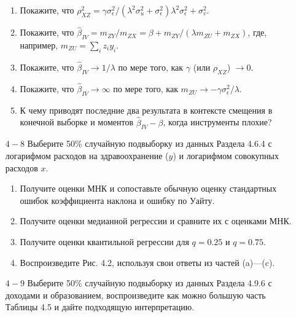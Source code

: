 \begin{small}
\begin{enumerate}
\begin{enumerate}
\item Покажите, что $\rho_{XZ}^2 = \gamma \sigma^2_{\epsilon} /(\lambda^2 \sigma^2_{u} +\sigma^2_{\epsilon})\lambda^2 \sigma^2_{\epsilon} +\sigma^2_{v}$.
\item Покажите, что $\hat{\beta}_{IV} = m_{ZY}/m_{ZX} = \beta + m_{ZY}/(\lambda m_{ZU}+m_{ZX})$, где, например, $m_{ZU} = \sum_i z_i y_i$.
\item Покажите, что $\hat{\beta}_{IV}\rightarrow 1/\lambda$ по мере того, как $\gamma$ (или $\rho_{XZ}$) $\rightarrow 0$.
\item  Покажите, что $\hat{\beta}_{IV}\rightarrow \infty$ по мере того, как $m_{ZU} \rightarrow -\gamma \sigma^2_{\epsilon}/\lambda$.
\item К чему приводят последние два результата в контексте смещения в конечной выборке и моментов $\hat{\beta}_{IV}-\beta$, когда инструменты плохие?
\end{enumerate}
\item [$4-8$] Выберите 50\% случайную подвыборку из данных Раздела 4.6.4 с логарифмом расходов на здравоохранение ($y$) и логарифмом совокупных расходов $x$.
\begin{enumerate} 
\item Получите оценки МНК и сопоставьте обычную оценку стандартных ошибок коэффициента наклона и ошибку по Уайту.
\item Получите оценки медианной регрессии и сравните их с оценками МНК. 
\item Получите оценки квантильной регрессии для $q=0.25$ и $q=0.75$.
\item Воспроизведите Рис. 4.2, используя свои ответы из частей (a)---(c).
\end{enumerate}
\item [$4-9$] Выберите 50\% случайную подвыборку из данных Раздела 4.9.6 с доходами и образованием, воспроизведите как можно большую часть Таблицы 4.5  и дайте подходящую интерпретацию.
\end{enumerate}

\end{small}

